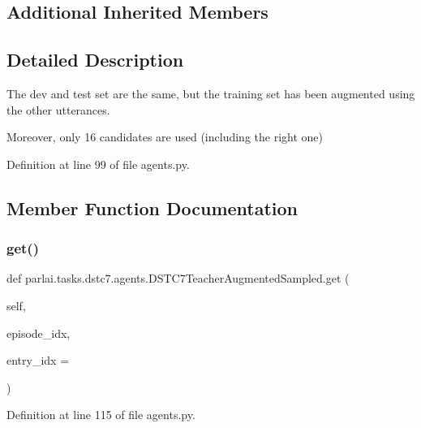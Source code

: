 \subsection*{Additional Inherited Members}


\subsection{Detailed Description}
\begin{DoxyVerb}The dev and test set are the same, but the training set has been augmented using the
other utterances.

Moreover, only 16 candidates are used (including the right one)
\end{DoxyVerb}
 

Definition at line 99 of file agents.\+py.



\subsection{Member Function Documentation}
\mbox{\label{classparlai_1_1tasks_1_1dstc7_1_1agents_1_1DSTC7TeacherAugmentedSampled_a0df2da11ff943988cb4eb01dab6354c8}} 
\subsubsection{\texorpdfstring{get()}{get()}}
{\footnotesize\ttfamily def parlai.\+tasks.\+dstc7.\+agents.\+D\+S\+T\+C7\+Teacher\+Augmented\+Sampled.\+get (\begin{DoxyParamCaption}\item[{}]{self,  }\item[{}]{episode\+\_\+idx,  }\item[{}]{entry\+\_\+idx = {} }\end{DoxyParamCaption})}



Definition at line 115 of file agents.\+py.


